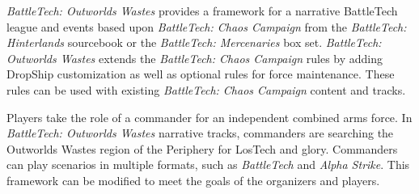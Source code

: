 \emph{BattleTech: Outworlds Wastes} provides a framework for a narrative BattleTech league and events based upon \emph{BattleTech: Chaos Campaign} from the \emph{BattleTech: Hinterlands} sourcebook or the \emph{BattleTech: Mercenaries} box set.
\emph{BattleTech: Outworlds Wastes} extends the \emph{BattleTech: Chaos Campaign} rules by adding DropShip customization as well as optional rules for force maintenance.
These rules can be used with existing \emph{BattleTech: Chaos Campaign} content and tracks.

Players take the role of a commander for an independent combined arms force.
In \emph{BattleTech: Outworlds Wastes} narrative tracks, commanders are searching the Outworlds Wastes region of the Periphery for LosTech and glory.
Commanders can play scenarios in multiple formats, such as \emph{BattleTech} and \emph{Alpha Strike}.
This framework can be modified to meet the goals of the organizers and players.

